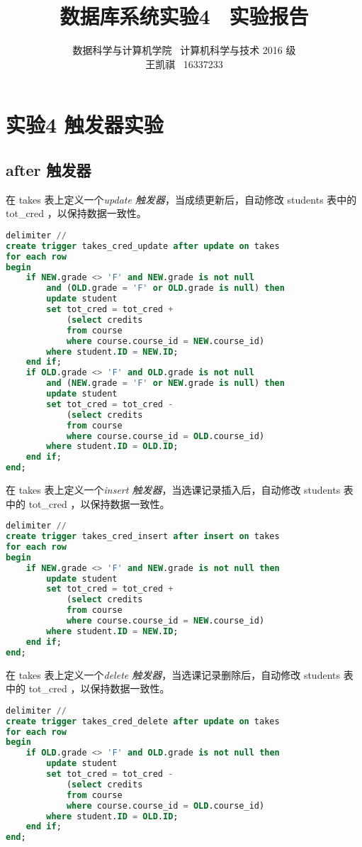 \documentclass{article}
\begin{document}
\title{数据库系统实验4 \ 实验报告}
\author {数据科学与计算机学院 \ 计算机科学与技术 2016 级 \\ 王凯祺 \ 16337233}
\maketitle

\section{实验4 触发器实验}

\subsection{after 触发器}

在 takes 表上定义一个\emph{update 触发器}，当成绩更新后，自动修改 students 表中的 tot\_cred ，以保持数据一致性。

\begin{lstlisting}[language=sql]
delimiter //
create trigger takes_cred_update after update on takes
for each row
begin
	if NEW.grade <> 'F' and NEW.grade is not null
		and (OLD.grade = 'F' or OLD.grade is null) then
		update student
		set tot_cred = tot_cred +
			(select credits
			from course
			where course.course_id = NEW.course_id)
		where student.ID = NEW.ID;
    end if;
    if OLD.grade <> 'F' and OLD.grade is not null
		and (NEW.grade = 'F' or NEW.grade is null) then
		update student
		set tot_cred = tot_cred -
			(select credits
			from course
			where course.course_id = OLD.course_id)
		where student.ID = OLD.ID;
    end if;
end;
\end{lstlisting}

在 takes 表上定义一个\emph{insert 触发器}，当选课记录插入后，自动修改 students 表中的 tot\_cred ，以保持数据一致性。

\begin{lstlisting}[language=sql]
delimiter //
create trigger takes_cred_insert after insert on takes
for each row
begin
	if NEW.grade <> 'F' and NEW.grade is not null then
		update student
		set tot_cred = tot_cred +
			(select credits
			from course
			where course.course_id = NEW.course_id)
		where student.ID = NEW.ID;
    end if;
end;
\end{lstlisting}

在 takes 表上定义一个\emph{delete 触发器}，当选课记录删除后，自动修改 students 表中的 tot\_cred ，以保持数据一致性。

\begin{lstlisting}[language=sql]
delimiter //
create trigger takes_cred_delete after update on takes
for each row
begin
    if OLD.grade <> 'F' and OLD.grade is not null then
		update student
		set tot_cred = tot_cred -
			(select credits
			from course
			where course.course_id = OLD.course_id)
		where student.ID = OLD.ID;
    end if;
end;
\end{lstlisting}
\end{document}
